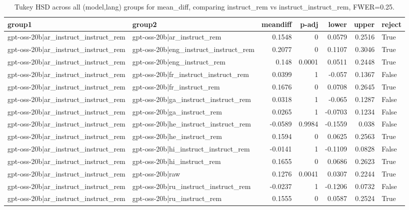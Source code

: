 \begin{table}
\caption{Tukey HSD across all (model,lang) groups for mean_diff, comparing instruct_rem vs instruct_instruct_rem, FWER=0.25.}
\label{tab:tukey_all_models_all_langs_mean_diff_instruct_rem_vs_instruct_instruct_rem}
\begin{tabular}{l l r r r r l}
\toprule
group1 & group2 & meandiff & p-adj & lower & upper & reject \\
\midrule
gpt-oss-20b|ar_instruct_instruct_rem & gpt-oss-20b|ar_instruct_rem & 0.1548 & 0 & 0.0579 & 0.2516 & True \\
gpt-oss-20b|ar_instruct_instruct_rem & gpt-oss-20b|eng_instruct_instruct_rem & 0.2077 & 0 & 0.1107 & 0.3046 & True \\
gpt-oss-20b|ar_instruct_instruct_rem & gpt-oss-20b|eng_instruct_rem & 0.148 & 0.0001 & 0.0511 & 0.2448 & True \\
gpt-oss-20b|ar_instruct_instruct_rem & gpt-oss-20b|fr_instruct_instruct_rem & 0.0399 & 1 & -0.057 & 0.1367 & False \\
gpt-oss-20b|ar_instruct_instruct_rem & gpt-oss-20b|fr_instruct_rem & 0.1676 & 0 & 0.0708 & 0.2645 & True \\
gpt-oss-20b|ar_instruct_instruct_rem & gpt-oss-20b|ga_instruct_instruct_rem & 0.0318 & 1 & -0.065 & 0.1287 & False \\
gpt-oss-20b|ar_instruct_instruct_rem & gpt-oss-20b|ga_instruct_rem & 0.0265 & 1 & -0.0703 & 0.1234 & False \\
gpt-oss-20b|ar_instruct_instruct_rem & gpt-oss-20b|he_instruct_instruct_rem & -0.0589 & 0.9984 & -0.1559 & 0.038 & False \\
gpt-oss-20b|ar_instruct_instruct_rem & gpt-oss-20b|he_instruct_rem & 0.1594 & 0 & 0.0625 & 0.2563 & True \\
gpt-oss-20b|ar_instruct_instruct_rem & gpt-oss-20b|hi_instruct_instruct_rem & -0.0141 & 1 & -0.1109 & 0.0828 & False \\
gpt-oss-20b|ar_instruct_instruct_rem & gpt-oss-20b|hi_instruct_rem & 0.1655 & 0 & 0.0686 & 0.2623 & True \\
gpt-oss-20b|ar_instruct_instruct_rem & gpt-oss-20b|raw & 0.1276 & 0.0041 & 0.0307 & 0.2244 & True \\
gpt-oss-20b|ar_instruct_instruct_rem & gpt-oss-20b|ru_instruct_instruct_rem & -0.0237 & 1 & -0.1206 & 0.0732 & False \\
gpt-oss-20b|ar_instruct_instruct_rem & gpt-oss-20b|ru_instruct_rem & 0.1555 & 0 & 0.0587 & 0.2524 & True \\

\end{tabular}
\end{table}

